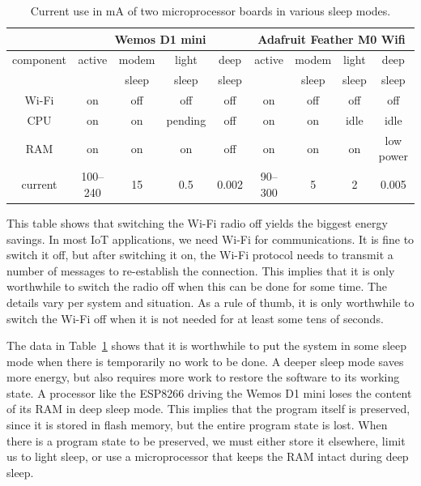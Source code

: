 \documentclass[runningheads]{llncs}
\begin{document}
\begin{table}[t]
	\centering
	\begin{tabular}{ccccccccc}
		\toprule
		& \multicolumn{4}{c}{Wemos D1 mini} & \multicolumn{4}{c}{Adafruit Feather M0 Wifi} \\
		\midrule
		component & active & modem & light & deep & active & modem & light & deep \\
				  & & sleep & sleep & sleep & & sleep & sleep & sleep \\
				  \midrule
		Wi-Fi & on & off & off & off  & on & off & off & off \\
		CPU & on & on & pending & off & on & on & idle & idle \\
		RAM & on & on & on & off & on & on & on & low power \\
		current & 100--240 & 15 & 0.5 & 0.002 & 90--300 & 5 & 2 &  0.005\\
		\bottomrule
	\end{tabular}
	\caption{Current use in mA of two microprocessor boards in various sleep modes.}%
	\label{tbl:sleep}
\end{table}

This table shows that switching the Wi-Fi radio off yields the biggest energy savings.
In most IoT applications, we need Wi-Fi for communications.
It is fine to switch it off, but after switching it on, the Wi-Fi protocol needs to transmit a number of messages to re-establish the connection.
This implies that it is only worthwhile to switch the radio off when this can be done for some time.
The details vary per system and situation.
As a rule of thumb, it is only worthwhile to switch the Wi-Fi off when it is not needed for at least some tens of seconds.

The data in Table~\ref{tbl:sleep} shows that it is worthwhile to put the system in some sleep mode when there is temporarily no work to be done.
A deeper sleep mode saves more energy, but also requires more work to restore the software to its working state.
A processor like the ESP8266 driving the Wemos D1 mini loses the content of its RAM in deep sleep mode.
This implies that the program itself is preserved, since it is stored in flash memory, but the entire program state is lost.
When there is a program state to be preserved, we must either store it elsewhere, limit us to light sleep, or use a microprocessor that keeps the RAM intact during deep sleep.
\end{document}

